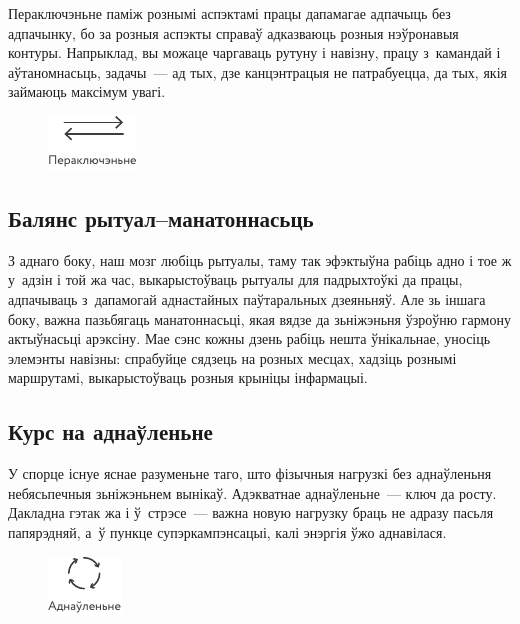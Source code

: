 Пераключэньне паміж рознымі аспэктамі працы дапамагае адпачыць без адпачынку, бо за розныя аспэкты справаў адказваюць розныя нэўронавыя контуры. Напрыклад, вы можаце чаргаваць рутуну і навізну, працу з~камандай і аўтаномнасьць, задачы~--- ад тых, дзе канцэнтрацыя не патрабуецца, да тых, якія займаюць максімум увагі.

\begin{figure}[htb!]
  \centering
  \includegraphics[scale=1.5]{willpower/ch7/9.pdf}
\end{figure}

\subsection*{Балянс рытуал--манатоннасьць}

З аднаго боку, наш мозг любіць рытуалы, таму так эфэктыўна рабіць адно і тое ж у~адзін і той жа час, выкарыстоўваць рытуалы для падрыхтоўкі да працы, адпачываць з~дапамогай аднастайных паўтаральных дзеяньняў. Але зь іншага боку, важна пазьбягаць манатоннасьці, якая вядзе да зьніжэньня ўзроўню гармону актыўнасьці арэксіну. Мае сэнс кожны дзень рабіць нешта ўнікальнае, уносіць элемэнты навізны: спрабуйце сядзець на розных месцах, хадзіць рознымі маршрутамі, выкарыстоўваць розныя крыніцы інфармацыі.

\subsection*{Курс на аднаўленьне}

У спорце існуе яснае разуменьне таго, што фізычныя нагрузкі без аднаўленьня небясьпечныя зьніжэньнем вынікаў. Адэкватнае аднаўленьне~--- ключ да росту. Дакладна гэтак жа і ў~стрэсе~--- важна новую нагрузку браць не адразу пасьля папярэдняй, а~ў пункце супэркампэнсацыі, калі энэргія ўжо аднавілася.

\begin{figure}[htb!]
  \centering
  \includegraphics[scale=1.5]{willpower/ch7/10.pdf}
\end{figure}


